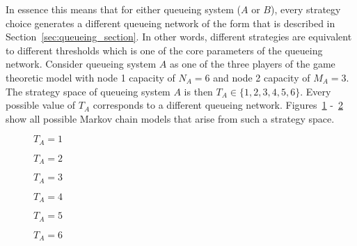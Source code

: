 In essence this means that for either queueing system  (\(A\) or \(B\)), every
strategy
choice generates a different queueing network of the form that is described in
Section~\ref{sec:queueing_section}.
In other words, different strategies are equivalent to different thresholds
which is one of the core parameters of the queueing network.
Consider queueing system \(A\) as one of the three players of the game theoretic
model with node 1 capacity of \(N_A = 6\) and node 2 capacity of \(M_A = 3\).
The strategy space of queueing system \(A\) is then
\(T_A \in \{1, 2, 3, 4, 5, 6\}\).
Every possible value of \(T_A\) corresponds to a different queueing network.
Figures~\ref{fig:game_strategy_visualisation_N_6_M_3_first}
-~\ref{fig:game_strategy_visualisation_N_6_M_3_last} show all possible Markov chain
models that arise from such a strategy space.

\begin{figure}[H]
    \centering
    \scalebox{0.8}{
        
    }
    \caption{\(T_A = 1\)}
    \label{fig:game_strategy_visualisation_N_6_M_3_first}
\end{figure}

\begin{figure}[H]
    \centering
    \scalebox{0.8}{
        
    }
    \caption{\(T_A = 2\)}
\end{figure}

\begin{figure}[H]
    \centering
    \scalebox{0.8}{
        
    }
    \caption{\(T_A = 3\)}
\end{figure}


\begin{figure}[H]
    \centering
    \scalebox{0.8}{
        
    }
    \caption{\(T_A = 4\)}
\end{figure}

\begin{figure}[H]
    \centering
    \scalebox{0.8}{
        
    }
    \caption{\(T_A = 5\)}
\end{figure}

\begin{figure}[H]
    \centering
    \scalebox{0.8}{
        
    }
    \caption{\(T_A = 6\)}
    \label{fig:game_strategy_visualisation_N_6_M_3_last}
\end{figure}

